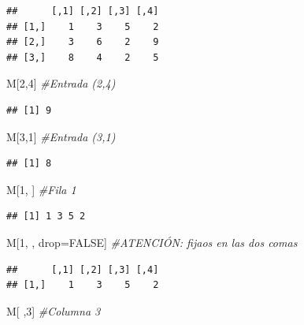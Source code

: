 \documentclass[]{book}
\newenvironment{Shaded}{\begin{snugshade}}{\end{snugshade}}
\newcommand{\CommentTok}[1]{\textcolor[rgb]{0.56,0.35,0.01}{\textit{#1}}}
\newcommand{\DecValTok}[1]{\textcolor[rgb]{0.00,0.00,0.81}{#1}}
\newcommand{\NormalTok}[1]{#1}
\newcommand{\OtherTok}[1]{\textcolor[rgb]{0.56,0.35,0.01}{#1}}
\theoremstyle{definition}
\theoremstyle{definition}
\theoremstyle{definition}
\theoremstyle{remark}
\begin{document}
\begin{verbatim}
##      [,1] [,2] [,3] [,4]
## [1,]    1    3    5    2
## [2,]    3    6    2    9
## [3,]    8    4    2    5
\end{verbatim}

\begin{Shaded}
\begin{Highlighting}[]
\NormalTok{M[}\DecValTok{2}\NormalTok{,}\DecValTok{4}\NormalTok{]  }\CommentTok{#Entrada (2,4)}
\end{Highlighting}
\end{Shaded}

\begin{verbatim}
## [1] 9
\end{verbatim}

\begin{Shaded}
\begin{Highlighting}[]
\NormalTok{M[}\DecValTok{3}\NormalTok{,}\DecValTok{1}\NormalTok{]  }\CommentTok{#Entrada (3,1)}
\end{Highlighting}
\end{Shaded}

\begin{verbatim}
## [1] 8
\end{verbatim}

\begin{Shaded}
\begin{Highlighting}[]
\NormalTok{M[}\DecValTok{1}\NormalTok{, ]  }\CommentTok{#Fila 1}
\end{Highlighting}
\end{Shaded}

\begin{verbatim}
## [1] 1 3 5 2
\end{verbatim}

\begin{Shaded}
\begin{Highlighting}[]
\NormalTok{M[}\DecValTok{1}\NormalTok{, , drop=}\OtherTok{FALSE}\NormalTok{] }\CommentTok{#ATENCIÓN: fijaos en las dos comas}
\end{Highlighting}
\end{Shaded}

\begin{verbatim}
##      [,1] [,2] [,3] [,4]
## [1,]    1    3    5    2
\end{verbatim}

\begin{Shaded}
\begin{Highlighting}[]
\NormalTok{M[ ,}\DecValTok{3}\NormalTok{]  }\CommentTok{#Columna 3}
\end{Highlighting}
\end{Shaded}
\end{document}

